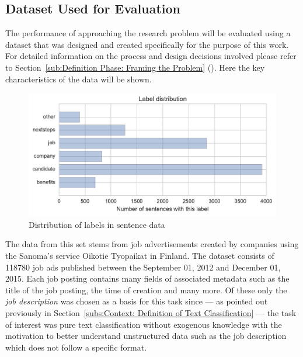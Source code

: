 \subsection{Dataset Used for Evaluation}
\label{subs:Dataset Used for Evaluation}

The performance of approaching the research problem will be evaluated using a dataset that was designed and created specifically for the purpose of this work. For detailed information on the process and design decisions involved please refer to Section~\ref{sub:Definition Phase: Framing the Problem} (). Here the key characteristics of the data will be shown.

\begin{figure}[h]
    \centering
    \includegraphics[width=\textwidth]{img/sentence-data-label-dist.pdf}
    \caption{Distribution of labels in sentence data}
\label{fig:sentence-data-label-dist}
\end{figure}

The data from this set stems from job advertisements created by companies using the \gls{Sanoma}'s service \gls{Oikotie Tyopaikat} in Finland. The dataset consists of 118780 job ads published between the September 01, 2012 and December 01, 2015. Each job posting contains many fields of associated metadata such as the title of the job posting, the time of creation and many more. Of these only the \emph{job description} was chosen as a basis for this task since --- as pointed out previously in Section~\ref{subs:Context: Definition of Text Classification} --- the task of interest was pure text classification without exogenous knowledge with the motivation to better understand unstructured data such as the job description which does not follow a specific format.

